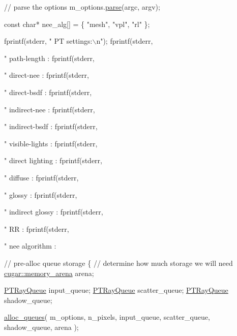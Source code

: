 \begin{DoxyCodeInclude}
    \textcolor{comment}{// parse the options}
    m\_options.\hyperlink{struct_hello_p_t_options_a540d006dee6aff8ee5e8b3cfc8b0fa0b}{parse}(argc, argv);

    \textcolor{keyword}{const} \textcolor{keywordtype}{char}* nee\_alg[] = \{ \textcolor{stringliteral}{"mesh"}, \textcolor{stringliteral}{"vpl"}, \textcolor{stringliteral}{"rl"} \};

    fprintf(stderr, \textcolor{stringliteral}{"  PT settings:\(\backslash\)n"});
    fprintf(stderr, \textcolor{stringliteral}{"    path-length     : %
    fprintf(stderr, \textcolor{stringliteral}{"    direct-nee      : %
    fprintf(stderr, \textcolor{stringliteral}{"    direct-bsdf     : %
    fprintf(stderr, \textcolor{stringliteral}{"    indirect-nee    : %
    fprintf(stderr, \textcolor{stringliteral}{"    indirect-bsdf   : %
    fprintf(stderr, \textcolor{stringliteral}{"    visible-lights  : %
    fprintf(stderr, \textcolor{stringliteral}{"    direct lighting : %
    fprintf(stderr, \textcolor{stringliteral}{"    diffuse         : %
    fprintf(stderr, \textcolor{stringliteral}{"    glossy          : %
    fprintf(stderr, \textcolor{stringliteral}{"    indirect glossy : %
    fprintf(stderr, \textcolor{stringliteral}{"    RR              : %
    fprintf(stderr, \textcolor{stringliteral}{"    nee algorithm   : %

    \textcolor{comment}{// pre-alloc queue storage}
    \{
        \textcolor{comment}{// determine how much storage we will need}
        \hyperlink{structcugar_1_1memory__arena}{cugar::memory\_arena} arena;

        \hyperlink{struct_p_t_ray_queue}{PTRayQueue}    input\_queue;
        \hyperlink{struct_p_t_ray_queue}{PTRayQueue}    scatter\_queue;
        \hyperlink{struct_p_t_ray_queue}{PTRayQueue}    shadow\_queue;

        \hyperlink{group___p_t_lib_gaf8daef8b815f7712ff692edbaa628881}{alloc\_queues}(
            m\_options,
            n\_pixels,
            input\_queue,
            scatter\_queue,
            shadow\_queue,
            arena );

}}}}}}}}}}}}
\end{DoxyCodeInclude}
